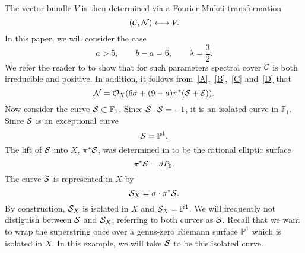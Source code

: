 \documentclass[a4paper,12pt]{article}
\numberwithin{equation}{section}
\theoremstyle{plain}
\begin{document}
The vector bundle $V$ is then determined via a Fourier-Mukai
transformation
%
\begin{equation}
({\cal C}, {\cal N}) \longleftrightarrow V.
\label{37}
\end{equation}
%
In this paper, we will consider the case
%
\begin{equation}
a > 5, \qquad b-a =6, \qquad \lambda =\frac{3}{2}.
\label{D}
\end{equation}
%
We refer the reader to \cite{BDOold} to show that for such parameters
spectral cover ${\cal C}$ is both irreducible and positive. In addition,
it follows from~\eqref{A},~\eqref{B},~\eqref{C} and~\eqref{D}
that
%
\begin{equation}
{\cal N} = {\cal O}_{X} (6 \sigma  +
(9-a)\pi^{*}({\cal S} + {\cal E})).
\label{38}
\end{equation}
Now consider the curve ${\cal S} \subset {\mathbb F}_1$. Since
${\cal S} \cdot {\cal S} =-1$, it is an isolated curve in ${\mathbb F}_1$.
Since ${\cal S}$ is an exceptional curve
%
\begin{equation}
{\cal S} ={\mathbb P}^{1}.
\label{39}
\end{equation}
%
The lift of ${\cal S}$ into $X$, $\pi^{*} {\cal S}$, was determined
in \cite{BDOold} to be the rational elliptic surface
%
\begin{equation}
\pi^{*}{\cal S} =dP_{9}.
\label{40}
\end{equation}
%
The curve ${\cal S}$ is represented in $X$ by
%
\begin{equation}
{\cal S}_{X} =\sigma \cdot \pi^{*}{\cal S}.
\label{41}
\end{equation}
%
By construction, ${\cal S}_{X}$ is isolated in $X$ and
${\cal S}_{X} ={\mathbb P}^{1}$. We will frequently not distiguish between
${\cal S}$ and ${\cal S}_{X}$, referring to both curves as ${\cal S}$.
Recall that we want to wrap the superstring once over a genus-zero Riemann
surface
${\mathbb P}^{1}$ which is isolated in $X$. In this example, we will take
${\cal S}$ to be this isolated curve.
\end{document}
